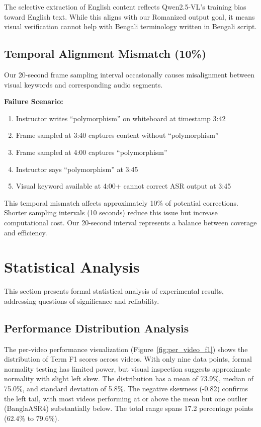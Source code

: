 The selective extraction of English content reflects Qwen2.5-VL's training bias toward English text. While this aligns with our Romanized output goal, it means visual verification cannot help with Bengali terminology written in Bengali script.

\subsection{Temporal Alignment Mismatch (10\%)}

Our 20-second frame sampling interval occasionally causes misalignment between visual keywords and corresponding audio segments.

\textbf{Failure Scenario:}

\begin{enumerate}
    \item Instructor writes ``polymorphism'' on whiteboard at timestamp 3:42
    \item Frame sampled at 3:40 captures content without ``polymorphism''
    \item Frame sampled at 4:00 captures ``polymorphism''
    \item Instructor says ``polymorphism'' at 3:45
    \item Visual keyword available at 4:00+ cannot correct ASR output at 3:45
\end{enumerate}

This temporal mismatch affects approximately 10\% of potential corrections. Shorter sampling intervals (10 seconds) reduce this issue but increase computational cost. Our 20-second interval represents a balance between coverage and efficiency.

\section{Statistical Analysis}

This section presents formal statistical analysis of experimental results, addressing questions of significance and reliability.

\subsection{Performance Distribution Analysis}

The per-video performance visualization (Figure~\ref{fig:per_video_f1}) shows the distribution of Term F1 scores across videos. With only nine data points, formal normality testing has limited power, but visual inspection suggests approximate normality with slight left skew. The distribution has a mean of 73.9\%, median of 75.0\%, and standard deviation of 5.8\%. The negative skewness (-0.82) confirms the left tail, with most videos performing at or above the mean but one outlier (BanglaASR4) substantially below. The total range spans 17.2 percentage points (62.4\% to 79.6\%).

